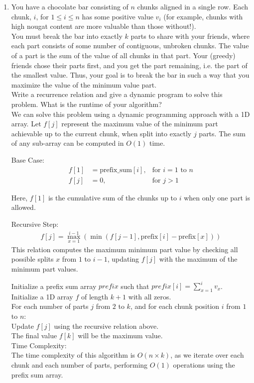 \documentclass{article}
\begin{document}
\begin{enumerate}
\newpage 
\item You have a chocolate bar consisting of $n$ chunks aligned in a single row. Each chunk, $i$, for $1 \leq i \leq n$ has some positive value $v_i$ (for example, chunks with high nougat content are more valuable than those without!). \\
You must break the bar into exactly $k$ parts to share with your friends, where each part consists of some number of contiguous, unbroken chunks. The value of a part is the sum of the value of all chunks in that part. Your (greedy) friends chose their parts first, and you get the part remaining, i.e. the part of the smallest value. Thus, your goal is to break the bar in such a way that you maximize the value of the minimum value part. \\
Write a recurrence relation and give a dynamic program to solve this problem. What is the runtime of your algorithm? \\
\newline 
We can solve this problem using a dynamic programming approach with a 1D array. Let $f[j]$ represent the maximum value of the minimum part achievable up to the current chunk, when split into exactly $j$ parts. The sum of any sub-array can be computed in $O(1)$ time.

Base Case: 
\begin{align*}
    f[1] &= \text{prefix\_sum}[i], & \text{for } i = 1 \text{ to } n \\
    f[j] &= 0, & \text{for } j > 1
\end{align*}

Here, $f[1]$ is the cumulative sum of the chunks up to $i$ when only one part is allowed.
    
Recursive Step:
\begin{align*}
    f[j] = \max_{x=1}^{i-1} \left( \min(f[j-1], \text{prefix}[i] - \text{prefix}[x]) \right)
\end{align*}
This relation computes the maximum minimum part value by checking all possible splits $x$ from $1$ to $i-1$, updating $f[j]$ with the maximum of the minimum part values.
    
Initialize a prefix sum array $prefix$ such that $prefix[i] = \sum_{x=1}^{i} v_x$. \\
Initialize a 1D array $f$ of length $k+1$ with all zeros. \\
For each number of parts $j$ from $2$ to $k$, and for each chunk position $i$ from $1$ to $n$: \\
Update $f[j]$ using the recursive relation above. \\
The final value $f[k]$ will be the maximum value. \\
\newline 
Time Complexity: \\
The time complexity of this algorithm is $O(n \times k)$, as we iterate over each chunk and each number of parts, performing $O(1)$ operations using the prefix sum array.






    
\end{enumerate}
\end{document}
